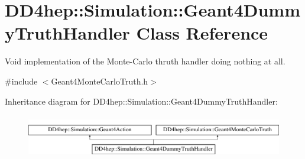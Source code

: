 \hypertarget{class_d_d4hep_1_1_simulation_1_1_geant4_dummy_truth_handler}{}\section{D\+D4hep\+:\+:Simulation\+:\+:Geant4\+Dummy\+Truth\+Handler Class Reference}
\label{class_d_d4hep_1_1_simulation_1_1_geant4_dummy_truth_handler}


Void implementation of the Monte-\/\+Carlo thruth handler doing nothing at all.  




{\ttfamily \#include $<$Geant4\+Monte\+Carlo\+Truth.\+h$>$}

Inheritance diagram for D\+D4hep\+:\+:Simulation\+:\+:Geant4\+Dummy\+Truth\+Handler\+:\begin{figure}[H]
\begin{center}
\leavevmode
\includegraphics[height=1.931034cm]{class_d_d4hep_1_1_simulation_1_1_geant4_dummy_truth_handler}
\end{center}
\end{figure}

